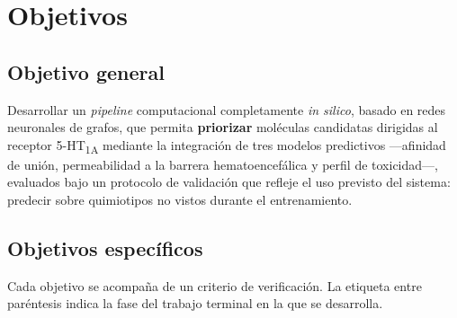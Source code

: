\section{Objetivos}
\label{cap:objetivos}

\subsection{Objetivo general}
\label{sec:obj-general}

Desarrollar un \textit{pipeline} computacional completamente \textit{in silico},
basado en redes neuronales de grafos, que permita \textbf{priorizar} moléculas
candidatas dirigidas al receptor 5-HT\textsubscript{1A} mediante la integración
de tres modelos predictivos —afinidad de unión, permeabilidad a la barrera
hematoencefálica y perfil de toxicidad—, evaluados bajo un protocolo de
validación que refleje el uso previsto del sistema: predecir sobre quimiotipos
no vistos durante el entrenamiento.

\subsection{Objetivos específicos}
\label{sec:obj-especificos}

Cada objetivo se acompaña de un criterio de verificación. La etiqueta entre
paréntesis indica la fase del trabajo terminal en la que se desarrolla.

